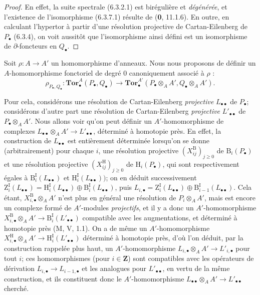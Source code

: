 \begin{proof}
En effet, la suite spectrale (6.3.2.1) est birégulière et \emph{dégénérée}, et
l'existence de l'isomorphisme (6.3.7.1) résulte de (\textbf{0}, 11.1.6). En outre, en
calculant l'hypertor à partir d'une résolution projective de Cartan-Eilenberg
de $P_\bullet$ (6.3.4), on voit aussitôt que l'isomorphisme ainsi défini est
un isomorphisme de $\partial$-foncteurs en $Q_\bullet$.
\end{proof}
\begin{env}[6.3.8]
Soit $\rho:A\to A'$ un homomorphisme d'anneaux. Nous nous proposons de
définir un $A$-homomorphisme fonctoriel de degré 0 canoniquement associé à
$\rho$ :
\[
  \rho_{P_\bullet,Q_\bullet}:
  \mathbf{Tor}_\bullet^A(P_\bullet,Q_\bullet)
  \longrightarrow
  \mathbf{Tor}_\bullet^{A'}
  (P_\bullet\otimes_A A',Q_\bullet\otimes_A A').
  \tag{6.3.8.1}\label{III.6.3.8.1.fr}
\]

Pour cela, considérons une résolution de Cartan-Eilenberg \emph{projective}
$L_{\bullet\bullet}$ de $P_\bullet$; considérons d'autre part une résolution
de Cartan-Eilenberg \emph{projective} $L'_{\bullet\bullet}$ de
$P_\bullet\otimes_A A'$. Nous allons voir qu'on peut définir un
$A'$-homomorphisme de complexes
$L_{\bullet\bullet}\otimes_A A'\to L'_{\bullet\bullet}$, déterminé à
homotopie près. En effet, la construction de $L_{\bullet\bullet}$ est
entièrement déterminée lorsqu'on se donne (arbitrairement) pour chaque $i$,
une résolution projective $(X_{ij}^{\mathrm B})_{j\geqslant0}$ de
$\mathrm B_i(P_\bullet)$ et une résolution projective
$(X_{ij}^{\mathrm H})_{j\geqslant0}$ de $\mathrm H_i(P_\bullet)$, qui sont
respectivement égales à $\mathrm B_i^{\mathrm I}(L_{\bullet\bullet})$ et
$\mathrm H_i^{\mathrm I}(L_{\bullet\bullet}))$; on en déduit successivement
$\mathrm Z_i^{\mathrm I}(L_{\bullet\bullet})
=\mathrm H_i^{\mathrm I}(L_{\bullet\bullet})
\oplus\mathrm B_i^{\mathrm I}(L_{\bullet\bullet})$, puis
$L_{i,\bullet}=\mathrm Z_i^{\mathrm I}(L_{\bullet\bullet})
\oplus\mathrm B_{i-1}^{\mathrm I}(L_{\bullet\bullet})$. Cela étant, $X_{i,\bullet}^{\mathrm B}\otimes_A A'$ n'est plus en général
une résolution de $P_i\otimes_A A'$, mais est encore un
complexe formé de $A'$-modules \emph{projectifs}, et il y a donc un
$A'$-homomorphisme
$X_{i,\bullet}^{\mathrm B}\otimes_A A'
\to\mathrm B_i^{\mathrm I}(L'_{\bullet\bullet})$
compatible avec les augmentations, et déterminé à homotopie près
(M, V, 1.1). On a de même un $A'$-homomorphisme
$X_{i,\bullet}^{\mathrm H}\otimes_A A'
\to\mathrm H_i^{\mathrm I}(L'_{\bullet\bullet})$
déterminé à homotopie près, d'où l'on déduit, par la construction rappelée
plus haut, un $A'$-homomorphisme
$L_{i,\bullet}\otimes_A A'\to L'_{i,\bullet}$ pour tout $i$; ces
homomorphismes (pour $i\in\mathbf Z$) sont compatibles avec les opérateurs de
dérivation $L_{i,\bullet}\to L_{i-1,\bullet}$ et les analogues pour
$L'_{\bullet\bullet}$, en vertu de la même construction, et ils constituent
donc le $A'$-homomorphisme
$L_{\bullet\bullet}\otimes_A A'\to L'_{\bullet\bullet}$ cherché.


\end{env}
